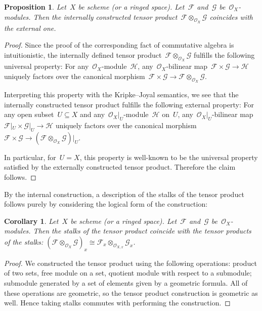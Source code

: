 \documentclass[10pt]{amsart}
\theoremstyle{definition}
\theoremstyle{plain}
\newtheorem{prop}[defn]{Proposition}
\newtheorem{cor}[defn]{Corollary}
\theoremstyle{remark}
\newcommand{\F}{\mathcal{F}}
\newcommand{\G}{\mathcal{G}}
\renewcommand{\H}{\mathcal{H}}
\renewcommand{\O}{\mathcal{O}}
\newcommand{\?}{\,{:}\,}
\renewcommand{\_}{\mathpunct{.}\,}
\begin{document}
\begin{prop}Let~$X$ be scheme (or a ringed space). Let~$\F$ and~$\G$
be~$\O_X$-modules. Then the internally constructed tensor product~$\F
\otimes_{\O_X} \G$ coincides with the external one.
\end{prop}
\begin{proof}
Since the proof of the corresponding fact of commutative algebra is
intuitionistic, the internally defined tensor product~$\F \otimes_{\O_X} \G$
fulfills the following universal property: For any~$\O_X$-module~$\H$,
any~$\O_X$-bilinear map~$\F \times \G \to \H$ uniquely factors over the
canonical morphism~$\F \times \G \to \F \otimes_{\O_X} \G$.

Interpreting this property with the Kripke--Joyal semantics, we see that the
internally constructed tensor product fulfills the following external property:
For any open subset~$U \subseteq X$ and any~$\O_X|_U$-module~$\H$ on~$U$,
any~$\O_X|_U$-bilinear map~$\F|_U \times \G|_U \to \H$ uniquely factors over the
canonical morphism~$\F \times \G \to (\F \otimes_{\O_X} \G)|_U$.

In particular, for~$U = X$, this property is well-known to be the universal
property satisfied by the externally constructed tensor product. Therefore the
claim follows.
\end{proof}

By the internal construction, a description of the stalks of the tensor product
follows purely by considering the logical form of the construction:
\begin{cor}Let~$X$ be scheme (or a ringed space). Let~$\F$ and~$\G$
be~$\O_X$-modules. Then the stalks of the tensor product coincide with the
tensor products of the stalks: $(\F \otimes_{\O_X} \G)_x \cong \F_x
\otimes_{\O_{X,x}} \G_x$.\end{cor}
\begin{proof}
We constructed the tensor product using the following operations: product of
two sets, free module on a set, quotient module with respect to a submodule;
submodule generated by a set of elements given by a geometric formula.
All of these operations are geometric, so the tensor product construction is
geometric as well. Hence taking stalks commutes with performing the
construction.
\end{proof}
\end{document}
